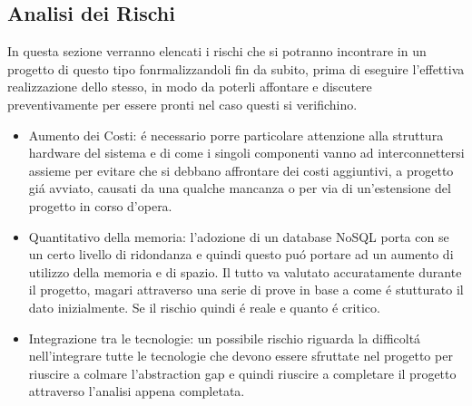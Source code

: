 \subsection{Analisi dei Rischi}

In questa sezione verranno elencati i rischi che si potranno incontrare in un progetto di questo tipo fonrmalizzandoli fin da subito, prima di eseguire l'effettiva realizzazione dello stesso, in modo da poterli affontare e discutere preventivamente per essere pronti nel caso questi si verifichino.

\begin{itemize}
  \item Aumento dei Costi: \'e necessario porre particolare attenzione alla struttura hardware del sistema e di come i singoli componenti vanno ad interconnettersi assieme per evitare che si debbano affrontare dei costi aggiuntivi, a progetto gi\'a avviato, causati da una qualche mancanza o per via di un'estensione del progetto in corso d'opera.
  \item Quantitativo della memoria: l'adozione di un database NoSQL porta con se un certo livello di ridondanza e quindi questo pu\'o portare ad un aumento di utilizzo della memoria e di spazio. Il tutto va valutato accuratamente durante il progetto, magari attraverso una serie di prove in base a come \'e stutturato il dato inizialmente. Se il rischio quindi \'e reale e quanto \'e critico.
  \item Integrazione tra le tecnologie: un possibile rischio riguarda la difficolt\'a nell'integrare tutte le tecnologie che devono essere sfruttate nel progetto per riuscire a colmare l'abstraction gap e quindi riuscire a completare il progetto attraverso l'analisi appena completata.
\end{itemize}
